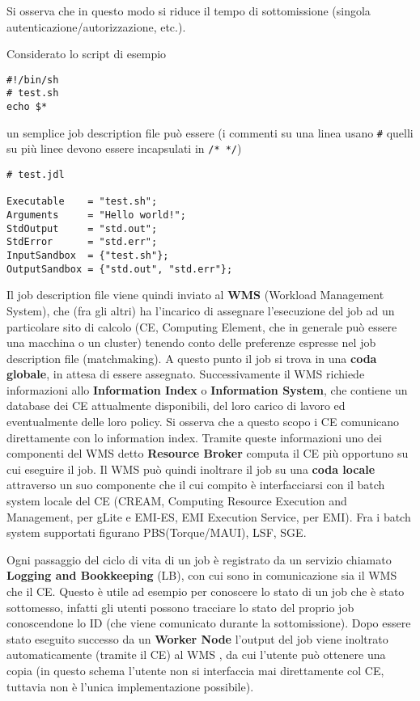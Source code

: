 \documentclass[italian,]{article}
\begin{document}
Si osserva che in questo modo si riduce il tempo di sottomissione
(singola autenticazione/autorizzazione, etc.).

Considerato lo script di esempio

\begin{verbatim}
#!/bin/sh
# test.sh
echo $*
\end{verbatim}

un semplice job description file può essere (i commenti su una linea
usano \texttt{\#} quelli su più linee devono essere incapsulati in
\texttt{/*\ */})

\begin{verbatim}
# test.jdl

Executable    = "test.sh";
Arguments     = "Hello world!";
StdOutput     = "std.out";
StdError      = "std.err";
InputSandbox  = {"test.sh"};
OutputSandbox = {"std.out", "std.err"};
\end{verbatim}

Il job description file viene quindi inviato al \textbf{WMS} (Workload
Management System), che (fra gli altri) ha l'incarico di assegnare
l'esecuzione del job ad un particolare sito di calcolo (CE, Computing
Element, che in generale può essere una macchina o un cluster) tenendo
conto delle preferenze espresse nel job description file (matchmaking).
A questo punto il job si trova in una \textbf{coda globale}, in attesa
di essere assegnato. Successivamente il WMS richiede informazioni allo
\textbf{Information Index} o \textbf{Information System}, che contiene
un database dei CE attualmente disponibili, del loro carico di lavoro ed
eventualmente delle loro policy. Si osserva che a questo scopo i CE
comunicano direttamente con lo information index. Tramite queste
informazioni uno dei componenti del WMS detto \textbf{Resource Broker}
computa il CE più opportuno su cui eseguire il job. Il WMS può quindi
inoltrare il job su una \textbf{coda locale} attraverso un suo
componente che il cui compito è interfacciarsi con il batch system
locale del CE (CREAM, Computing Resource Execution and Management, per
gLite e EMI-ES, EMI Execution Service, per EMI). Fra i batch system
supportati figurano PBS(Torque/MAUI), LSF, SGE.

Ogni passaggio del ciclo di vita di un job è registrato da un servizio
chiamato \textbf{Logging and Bookkeeping} (LB), con cui sono in
comunicazione sia il WMS che il CE. Questo è utile ad esempio per
conoscere lo stato di un job che è stato sottomesso, infatti gli utenti
possono tracciare lo stato del proprio job conoscendone lo ID (che viene
comunicato durante la sottomissione). Dopo essere stato eseguito
successo da un \textbf{Worker Node} l'output del job viene inoltrato
automaticamente (tramite il CE) al WMS , da cui l'utente può ottenere
una copia (in questo schema l'utente non si interfaccia mai direttamente
col CE, tuttavia non è l'unica implementazione possibile).
\end{document}
